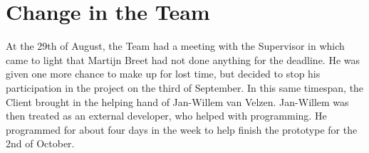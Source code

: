 \chapter{Change in the Team}
\thispagestyle{fancy}
\label{sec:teamchange}
At the 29th of August, the Team had a meeting with the Supervisor in which came to light that Martijn Breet had not done anything for the deadline. He was given one more chance to make up for lost time, but decided to stop his participation in the project on the third of September. In this same timespan, the Client brought in the helping hand of Jan-Willem van Velzen. Jan-Willem was then treated as an external developer, who helped with programming. He programmed for about four days in the week to help finish the prototype for the 2nd of October. 